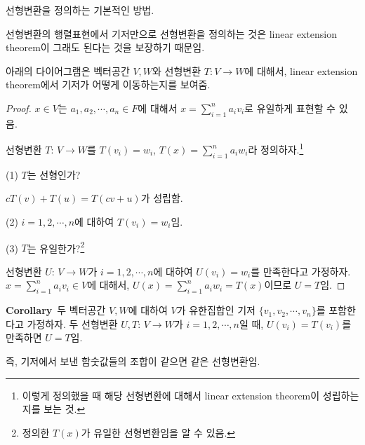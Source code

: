 \documentclass[10pt, a4paper]{article}
\begin{document}
선형변환을 정의하는 기본적인 방법.

선형변환의 행렬표현에서 기저만으로 선형변환을 정의하는 것은 linear extension theorem이 그래도 된다는 것을 보장하기 때문임.

아래의 다이어그램은 벡터공간 $V,W$와 선형변환 $T:V \rightarrow W$에 대해서, linear extension theorem에서 기저가 어떻게 이동하는지를 보여줌.


\begin{proof}
$x \in V$는 $a_1,a_2, \cdots ,a_n \in F$에 대해서 $x=\sum_{i=1}^{n}{a_{i}v_{i}}$로 유일하게 표현할 수 있음.

선형변환 $T:\,V \rightarrow W$를 $T(v_i)=w_i$, $T(x)=\sum_{i=1}^{n}{a_{i}w_{i}}$라 정의하자.\footnote{이렇게 정의했을 때 해당 선형변환에 대해서 linear extension theorem이 성립하는지를 보는 것.}

(1) $T$는 선형인가?

$cT(v)+T(u)=T(cv+u)$가 성립함.

(2) $i=1,2, \cdots ,n$에 대하여 $T(v_i)=w_i$임.

(3) $T$는 유일한가?\footnote{정의한 $T(x)$가 유일한 선형변환임을 알 수 있음.}

선형변환 $U:\,V \rightarrow W$가 $i=1,2, \cdots ,n$에 대하여 $U(v_i)=w_i$를 만족한다고 가정하자. $x=\sum_{i=1}^{n}{a_{i}v_{i}} \in V$에 대해서, $U(x)=\sum_{i=1}^{n}{a_{i}w_{i}}=T(x)$이므로 $U=T$임.
\end{proof}

\textbf{Corollary}\, 두 벡터공간 $V,W$에 대하여 $V$가 유한집합인 기저 $\{v_1,v_2, \cdots ,v_n\}$를 포함한다고 가정하자. 두 선형변환 $U,T:\,V \rightarrow W$가 $i=1,2, \cdots ,n$일 때, $U(v_i)=T(v_i)$를 만족하면 $U=T$임.

즉, 기저에서 보낸 함숫값들의 조합이 같으면 같은 선형변환임.
\end{document}

